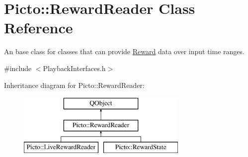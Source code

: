 \hypertarget{class_picto_1_1_reward_reader}{\section{Picto\-:\-:Reward\-Reader Class Reference}
\label{class_picto_1_1_reward_reader}
}


An base class for classes that can provide \hyperlink{class_picto_1_1_reward}{Reward} data over input time ranges.  




{\ttfamily \#include $<$Playback\-Interfaces.\-h$>$}

Inheritance diagram for Picto\-:\-:Reward\-Reader\-:\begin{figure}[H]
\begin{center}
\leavevmode
\includegraphics[height=3.000000cm]{class_picto_1_1_reward_reader}
\end{center}
\end{figure}
